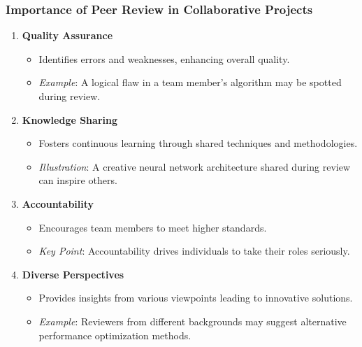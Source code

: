 \documentclass{beamer}
\begin{document}
\begin{frame}[fragile]
    \frametitle{Importance of Peer Review in Collaborative Projects}
    \begin{enumerate}
        \item \textbf{Quality Assurance}
        \begin{itemize}
            \item Identifies errors and weaknesses, enhancing overall quality.
            \item \textit{Example}: A logical flaw in a team member's algorithm may be spotted during review.
        \end{itemize}

        \item \textbf{Knowledge Sharing}
        \begin{itemize}
            \item Fosters continuous learning through shared techniques and methodologies.
            \item \textit{Illustration}: A creative neural network architecture shared during review can inspire others.
        \end{itemize}

        \item \textbf{Accountability}
        \begin{itemize}
            \item Encourages team members to meet higher standards.
            \item \textit{Key Point}: Accountability drives individuals to take their roles seriously.
        \end{itemize}

        \item \textbf{Diverse Perspectives}
        \begin{itemize}
            \item Provides insights from various viewpoints leading to innovative solutions.
            \item \textit{Example}: Reviewers from different backgrounds may suggest alternative performance optimization methods.
        \end{itemize}
    \end{enumerate}
\end{frame}
\end{document}
